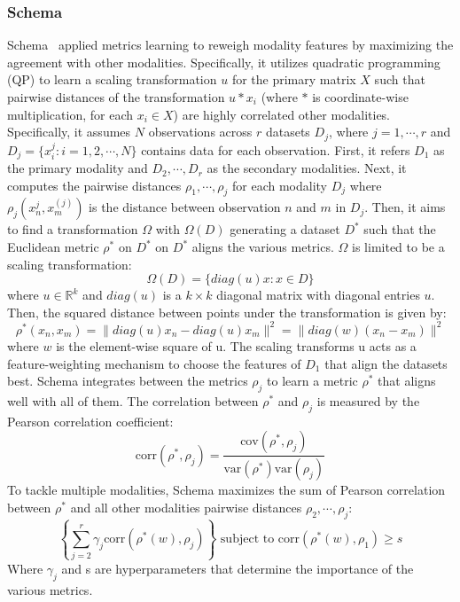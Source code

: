 \subsubsection{Schema}
Schema~\citep{singh2021schema}  applied metrics learning to reweigh modality features by maximizing the agreement with other modalities. Specifically, it utilizes quadratic programming (QP) to learn a scaling transformation $u$ for the primary matrix $X$ such that pairwise distances of the transformation $u *  x_i$ (where $*$ is coordinate-wise multiplication, for each $x_i\in X$) are highly correlated other modalities. Specifically, it assumes $N$ observations across $r$ datasets $D_j$, where $j=1,\cdots,r$ and $D_j  = \{x_i^{j}: i = 1,2,\cdots,N\}$ contains data for each observation. First, it refers $D_1$ as the primary modality and $D_2,\cdots,D_r$ as the secondary modalities. Next, it computes the pairwise distances $\rho_1,\cdots,\rho_j$ for each modality $D_j$ where $\rho_j(x_n^{j}, x_m^{(j)})$ is the distance between observation $n$ and $m$ in $D_j$. Then, it aims to find a transformation $\Omega$ with $\Omega(D)$ generating a dataset $D^{*}$ such that the Euclidean metric $\rho^{*}$ on $D^{*}$ on $D^{*}$ aligns the various metrics. $\Omega$ is limited to be a scaling transformation:
\begin{equation}
\Omega(D) = \{diag(u)x: x \in D\}
\end{equation}
where $u \in \mathbb{R}^{k}$ and  $diag(u)$ is a  $k\times k$ diagonal matrix with diagonal entries $u$. Then, the squared distance between points under the transformation is given by:
\begin{equation}
\rho^{*}(x_n, x_m) = \|diag(u)x_n - diag(u)x_m\|^2 = \|diag(w)(x_n - x_m)\|^2 
\end{equation}
where $w$ is the element-wise square of u. The scaling transforms u acts as a feature-weighting mechanism to choose the features of $D_1$ that align the datasets best. Schema integrates between the metrics $\rho_j$ to learn a metric $\rho^{*}$ that aligns well with all of them. The correlation between $\rho^{*}$ and $\rho_j$ is measured by the Pearson correlation coefficient:
\begin{equation}
	\text{corr}(\rho^{*}, \rho_j) = \frac{\text{cov}(\rho^{*}, \rho_j)}{\text{var}(\rho^{*})\text{var}(\rho_j)}
\end{equation}
To tackle multiple modalities, Schema maximizes the sum of Pearson correlation between $\rho^{*}$ and all other modalities pairwise distances $\rho_2,\cdots,\rho_j$:
\begin{equation}
	\left\{\sum_{j=2}^r \gamma_j \text{corr}(\rho^{*}(w), \rho_j)\right\} \text{ subject to corr}(\rho^{*}(w), \rho_1) \geq s 
\end{equation}
Where $\gamma_j$ and s are hyperparameters that determine the importance of the various metrics.


